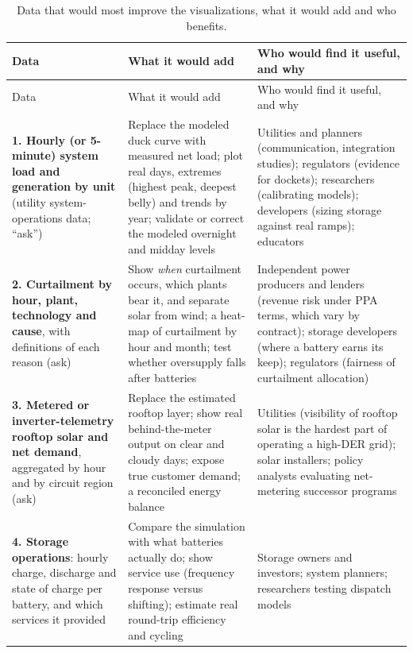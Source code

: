 \documentclass[11pt,a4paper]{article}
\begin{document}
{\footnotesize\setlength{\tabcolsep}{4pt}
\begin{longtable}{@{}>{\raggedright\arraybackslash}p{3.4cm}>{\raggedright\arraybackslash}p{5.9cm}>{\raggedright\arraybackslash}p{6.0cm}@{}}
\caption{Data that would most improve the visualizations, what it would add and who benefits.}\label{tab:extra}\\
\toprule
Data & What it would add & Who would find it useful, and why \\
\midrule
\endfirsthead
\toprule
Data & What it would add & Who would find it useful, and why \\
\midrule
\endhead
\bottomrule
\endfoot
\bottomrule
\endlastfoot
\textbf{1. Hourly (or 5-minute) system load and generation by unit} (utility system-operations data; ``ask'') &
 Replace the modeled duck curve with measured net load; plot real days, extremes (highest peak, deepest belly) and trends by year; validate or correct the modeled overnight and midday levels &
 Utilities and planners (communication, integration studies); regulators (evidence for dockets); researchers (calibrating models); developers (sizing storage against real ramps); educators \\
\addlinespace
\textbf{2. Curtailment by hour, plant, technology and cause}, with definitions of each reason (ask) &
 Show \emph{when} curtailment occurs, which plants bear it, and separate solar from wind; a heat-map of curtailment by hour and month; test whether oversupply falls after batteries &
 Independent power producers and lenders (revenue risk under PPA terms, which vary by contract); storage developers (where a battery earns its keep); regulators (fairness of curtailment allocation) \\
\addlinespace
\textbf{3. Metered or inverter-telemetry rooftop solar and net demand}, aggregated by hour and by circuit region (ask) &
 Replace the estimated rooftop layer; show real behind-the-meter output on clear and cloudy days; expose true customer demand; a reconciled energy balance &
 Utilities (visibility of rooftop solar is the hardest part of operating a high-DER grid); solar installers; policy analysts evaluating net-metering successor programs \\
\addlinespace
\textbf{4. Storage operations}: hourly charge, discharge and state of charge per battery, and which services it provided &
 Compare the simulation with what batteries actually do; show service use (frequency response versus shifting); estimate real round-trip efficiency and cycling &
 Storage owners and investors; system planners; researchers testing dispatch models \\

\end{longtable}}
\end{document}
